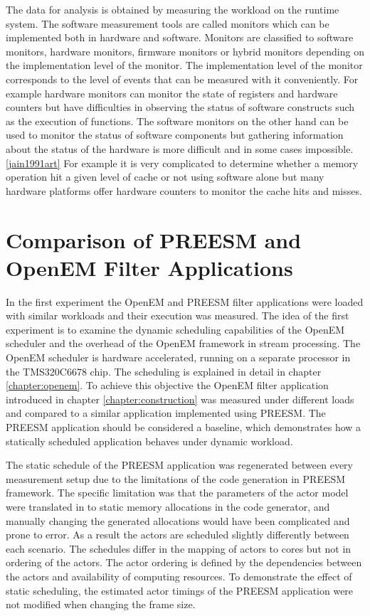 The data for analysis is obtained by measuring the workload on the runtime
system. The software measurement tools are called monitors which can be
implemented both in hardware and software. Monitors are classified to software
monitors, hardware monitors, firmware monitors or hybrid monitors depending on
the implementation level of the monitor. The implementation level of the monitor
corresponds to the level of events that can be measured with it conveniently.
For example hardware monitors can monitor the state of registers and hardware
counters but have difficulties in observing the status of software constructs
such as the execution of functions. The software monitors on the other hand can
be used to monitor the status of software components but gathering information
about the status of the hardware is more difficult and in some cases impossible.
\ref{jain1991art} For example it is very complicated to determine whether a
memory operation hit a given level of cache or not using software alone but many
hardware platforms offer hardware counters to monitor the cache hits and misses.

\section{Comparison of PREESM and OpenEM Filter Applications}
\label{sec:firstexperiment}
In the first experiment the OpenEM and PREESM filter applications were loaded
with similar workloads and their execution was measured. The idea of the first
experiment is to examine the dynamic scheduling capabilities of the OpenEM
scheduler and the overhead of the OpenEM framework in stream processing. The
OpenEM scheduler is hardware accelerated, running on a separate processor in the
TMS320C6678 chip. The scheduling is explained in detail in chapter
\ref{chapter:openem}. To achieve this objective the OpenEM filter application
introduced in chapter \ref{chapter:construction} was measured under different
loads and compared to a similar application implemented using PREESM. The
PREESM application should be considered a baseline, which demonstrates how a
statically scheduled application behaves under dynamic workload.

The static schedule of the PREESM application was regenerated between every
measurement setup due to the limitations of the code generation in PREESM
framework. The specific limitation was that the parameters of the actor model
were translated in to static memory allocations in the code generator, and
manually changing the generated allocations would have been complicated and
prone to error. As a result the actors are scheduled slightly differently
between each scenario. The schedules differ in the mapping of actors to cores
but not in ordering of the actors. The actor ordering is defined by the
dependencies between the actors and availability of computing resources. To
demonstrate the effect of static scheduling, the estimated actor timings of the
PREESM application were not modified when changing the frame size.

